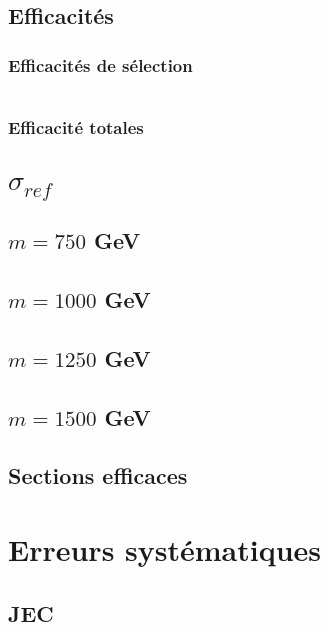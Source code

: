 \documentclass[twoside,12pt]{article}
\begin{document}
\subsection{Efficacités}
\subsubsection{Efficacités de sélection}

\begin{tabular}{|c|c|c|c|c|}
  
\end{tabular}

\subsubsection{Efficacité totales}


\section{$\sigma_{ref}$}
\subsection{$m = 750$ GeV}


\subsection{$m = 1000$ GeV}


\subsection{$m = 1250$ GeV}


\subsection{$m = 1500$ GeV}


\subsection{Sections efficaces}


\section{Erreurs systématiques}
\subsection{JEC}

\end{document}
